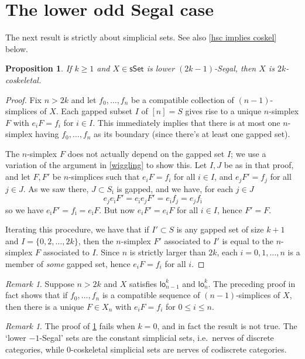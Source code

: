 \documentclass{amsart}
\newcommand{\lowod}{\mathsf{lo}}
\newcommand{\sset}{\mathsf{sSet}}
\newcommand{\bim}{{\bar \imath}}
\newtheorem{proposition}[theorem]{Proposition}
\theoremstyle{definition}
\theoremstyle{remark}
\newtheorem{remark}[theorem]{Remark}
\begin{document}
\section{The lower odd Segal case}
\label{sec lower odd}

The next result is strictly about simplicial sets.
See also \cref{hsc implies coskel} below.

\begin{proposition}\label{prop lower odd implies coskel}
If $k\geq 1$ and $X\in \sset$ is lower $(2k{-}1)$-Segal, then $X$ is $2k$-coskeletal.
\end{proposition}
\begin{proof}
Fix $n > 2k$ and let $f_0, \dots, f_n$ be a compatible collection of $(n-1)$-simplices of $X$.
Each gapped subset $I$ of $[n] = S$ gives rise to a unique $n$-simplex $F$ with $e_i F = f_i$ for $i\in I$. 
This immediately implies that there is at most one $n$-simplex having $f_0, \dots, f_n$ as its boundary (since there's at least one gapped set).

The $n$-simplex $F$ does not actually depend on the gapped set $I$; we use a variation of the argument in \cref{wiggling} to show this.
Let $I, J$ be as in that proof, and let $F,F'$ be $n$-simplices such that $e_i F = f_i$ for all $i\in I$, and $e_j F' = f_j$ for all $j\in J$.
As we saw there, $J\subset S_\bim$ is gapped, and we have, for each $j\in J$
\[
	e_j e_\bim F' = e_\bim e_j F' = e_\bim f_j = e_j f_\bim
\]
so we have $e_\bim F' = f_\bim = e_\bim F$.
But now $e_i F' = e_i F$ for all $i\in I$, hence $F'= F$.

Iterating this procedure, we have that if $I' \subset S$ is any gapped set of size $k+1$ and $I = \{0, 2, \dots, 2k\}$, then the $n$-simplex $F'$ associated to $I'$ is equal to the $n$-simplex $F$ associated to $I$.
Since $n$ is strictly larger than $2k$, each $i=0,1,\dots, n$ is a member of \emph{some} gapped set, hence $e_i F = f_i$ for all $i$.
\end{proof}

\begin{remark}\label{rmk extra from proof}
Suppose $n > 2k$ and $X$ satisfies $\lowod_{n-1}^k$ and $\lowod_n^k$.
The preceding proof in fact shows that if $f_0, \dots, f_n$ is a compatible sequence of $(n-1)$-simplices of $X$, then there is a unique $F\in X_n$ with $e_i F = f_i$ for $0 \leq i \leq n$.
\end{remark}

\begin{remark}\label{rmk -1 segal to 0 cosk}
The proof of \cref{prop lower odd implies coskel} fails when $k=0$, and in fact the result is not true.
The `lower $-1$-Segal' sets are the constant simplicial sets, i.e.\ nerves of discrete categories, while $0$-coskeletal simplicial sets are nerves of codiscrete categories.
\end{remark}
\end{document}
